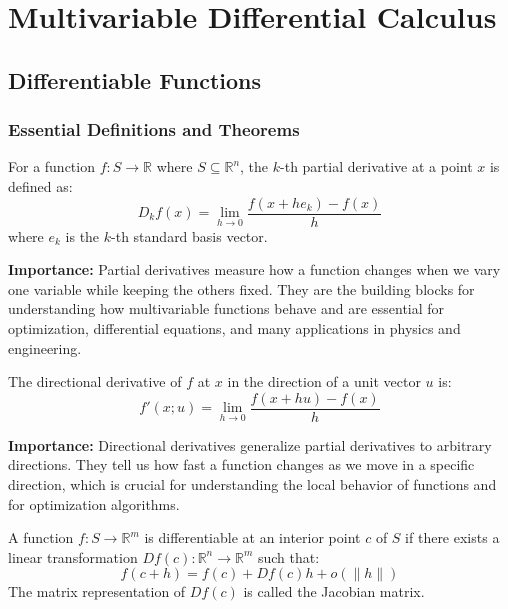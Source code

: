 \chapter{Multivariable Differential Calculus}

\section{Differentiable Functions}

\subsection*{Essential Definitions and Theorems}

\begin{definition}
For a function $f: S \to \mathbb{R}$ where $S \subseteq \mathbb{R}^n$, the $k$-th partial derivative at a point $x$ is defined as:
\[D_k f(x) = \lim_{h \to 0} \frac{f(x + he_k) - f(x)}{h}\]
where $e_k$ is the $k$-th standard basis vector.
\end{definition}

\noindent\textbf{Importance:} Partial derivatives measure how a function changes when we vary one variable while keeping the others fixed. They are the building blocks for understanding how multivariable functions behave and are essential for optimization, differential equations, and many applications in physics and engineering.



\begin{definition}
The directional derivative of $f$ at $x$ in the direction of a unit vector $u$ is:
\[f'(x; u) = \lim_{h \to 0} \frac{f(x + hu) - f(x)}{h}\]
\end{definition}

\noindent\textbf{Importance:} Directional derivatives generalize partial derivatives to arbitrary directions. They tell us how fast a function changes as we move in a specific direction, which is crucial for understanding the local behavior of functions and for optimization algorithms.



\begin{definition}
A function $f: S \to \mathbb{R}^m$ is differentiable at an interior point $c$ of $S$ if there exists a linear transformation $Df(c): \mathbb{R}^n \to \mathbb{R}^m$ such that:
\[f(c + h) = f(c) + Df(c)h + o(\|h\|)\]
The matrix representation of $Df(c)$ is called the Jacobian matrix.
\end{definition}

